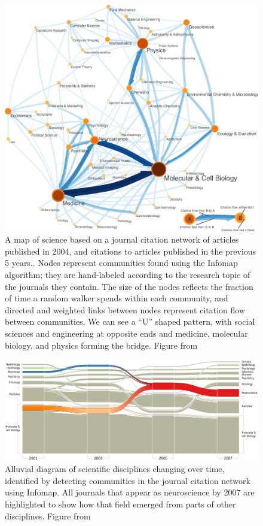 \begin{figure}
\centering
\includegraphics{img/rosvall2008_fig3_journals.jpg}
\caption{A map of science based on a journal citation network of
articles published in 2004, and citations to articles published in the
previous 5 years.. Nodes represent communities found using the Infomap
algorithm; they are hand-labeled according to the research topic of the
journals they contain. The size of the nodes reflects the fraction of
time a random walker spends within each community, and directed and
weighted links between nodes represent citation flow between
communities. We can see a ``U'' shaped pattern, with social sciences and
engineering at opposite ends and medicine, molecular biology, and
physics forming the bridge. Figure from
\autocite{rosvall_maps_2008}}\label{fig:journals}
\end{figure}

\begin{figure}
\centering
\includegraphics{img/rosvall2010_fig3_alluvial.png}
\caption{Alluvial diagram of scientific disciplines changing over time,
identified by detecting communities in the journal citation network
using Infomap. All journals that appear as neuroscience by 2007 are
highlighted to show how that field emerged from parts of other
disciplines. Figure from
\autocite{rosvall_mapping_2010}}\label{fig:alluvial}
\end{figure}

